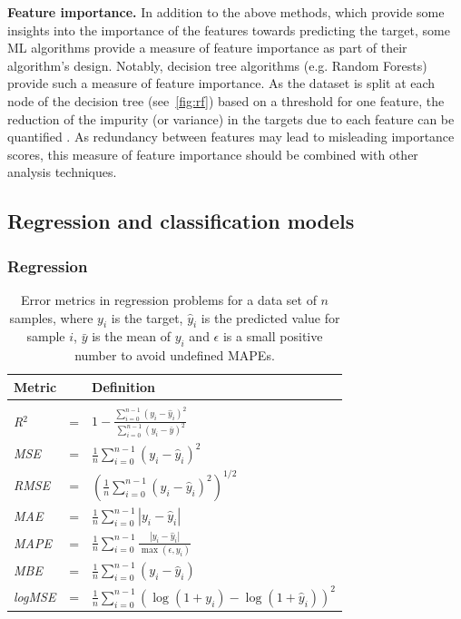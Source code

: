 \textbf{Feature importance.} In addition to the above methods, which provide some insights into the importance of the features towards predicting the target, some ML algorithms provide a measure of feature importance as part of their algorithm's design.
Notably, decision tree algorithms (e.g. Random Forests) provide such a measure of feature importance. As the dataset is split at each node of the decision tree (see~\ref{fig:rf}) based on a threshold for one feature, the reduction of the impurity (or variance) in the targets due to each feature can be quantified \cite{breiman_random_2001}.
As redundancy between features may lead to misleading importance scores, this measure of feature importance should be combined with other analysis techniques.

\subsection{Regression and classification models}
\label{ML_models}
\label{RF}

\subsubsection{Regression}
\begin{table}[tb]
\footnotesize
\centering
\caption{Error metrics in regression problems for a data set of $n$ samples, where $y_i$ is the target, $\hat{y}_i$ is the predicted value for sample $i$, $\bar{y}$ is the mean of $y_i$ and $\epsilon$ is a small positive number to avoid undefined MAPEs.} %
\label{tab:error_metrics}
\begin{tabular}{lcl}
\hline
\textbf{Metric} & & \textbf{Definition} \\ \hline
&&\\[-2ex]
\textit{R$^2$} &=& $\displaystyle 1-\frac{\sum_{i=0}^{n-1}\left(y_{i}-\hat{y}_{i}\right)^{2}}{\sum_{i=0}^{n-1}\left(y_{i}-\bar{y}\right)^{2}}$ \\[3ex]
\textit{MSE} &=& $\displaystyle \frac{1}{n} \sum_{i=0}^{n-1}\left( y_i - \hat{y}_i \right)^2$ \\[3ex]
\textit{RMSE} &=& $\displaystyle \left(\frac{1}{n} \sum_{i=0}^{n-1}\left( y_i - \hat{y}_i \right)^2\right)^{1/2}$ \\[3ex]
\textit{MAE} &=& $\displaystyle \frac{1}{n} \sum_{i=0}^{n-1}\left| y_i - \hat{y}_i \right| $ \\[3ex]
\textit{MAPE} &=& $\displaystyle \frac{1}{n} \sum_{i=0}^{n-1} \frac{\left| y_i - \hat{y}_i \right|}{\max(\epsilon,y_i)}$ \\[3ex]
\textit{MBE} &=& $\displaystyle \frac{1}{n} \sum_{i=0}^{n-1}\left( y_i - \hat{y}_i \right) $\\[3ex]
\textit{logMSE} &=& $\displaystyle \frac{1}{n} \sum_{i=0}^{n-1}\left( \log(1 + y_i) - \log(1 + \hat{y}_i) \right)^2$ \\[2ex] \hline
\end{tabular}
\end{table}

